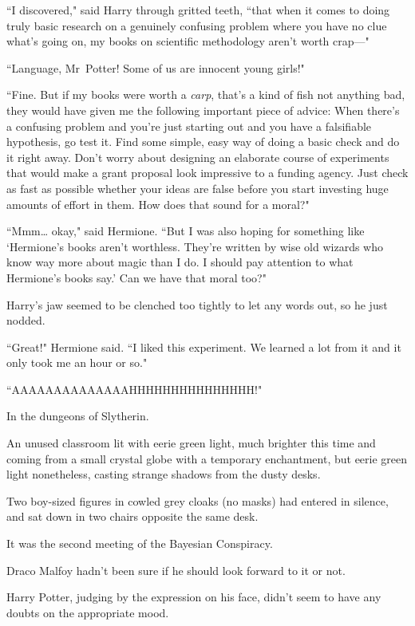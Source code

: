``I discovered," said Harry through gritted teeth, ``that when it comes to doing truly basic research on a genuinely confusing problem where you have no clue what's going on, my books on scientific methodology aren't worth crap—"

``Language, Mr~Potter! Some of us are innocent young girls!"

``Fine. But if my books were worth a \emph{carp}, that's a kind of fish not anything bad, they would have given me the following important piece of advice: When there's a confusing problem and you're just starting out and you have a falsifiable hypothesis, go test it. Find some simple, easy way of doing a basic check and do it right away. Don't worry about designing an elaborate course of experiments that would make a grant proposal look impressive to a funding agency. Just check as fast as possible whether your ideas are false before you start investing huge amounts of effort in them. How does that sound for a moral?"

``Mmm{\ldots} okay," said Hermione. ``But I was also hoping for something like `Hermione's books aren't worthless. They're written by wise old wizards who know way more about magic than I do. I should pay attention to what Hermione's books say.' Can we have that moral too?"

Harry's jaw seemed to be clenched too tightly to let any words out, so he just nodded.

``Great!" Hermione said. ``I liked this experiment. We learned a lot from it and it only took me an hour or so."

``AAAAAAAAAAAAAAHHHHHHHHHHHHHHH!"

\later

In the dungeons of Slytherin.

An unused classroom lit with eerie green light, much brighter this time and coming from a small crystal globe with a temporary enchantment, but eerie green light nonetheless, casting strange shadows from the dusty desks.

Two boy-sized figures in cowled grey cloaks (no masks) had entered in silence, and sat down in two chairs opposite the same desk.

It was the second meeting of the Bayesian Conspiracy.

Draco Malfoy hadn't been sure if he should look forward to it or not.

Harry Potter, judging by the expression on his face, didn't seem to have any doubts on the appropriate mood.

